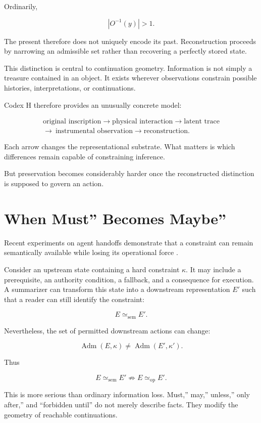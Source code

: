 \documentclass[11pt]{article}
\newcommand{\Adm}{\operatorname{Adm}}
\newcommand{\semEq}{\simeq_{\mathrm{sem}}}
\newcommand{\opEq}{\simeq_{\mathrm{op}}}
\begin{document}
Ordinarily,

\[ |O^{-1}(y)|>1.\]

The present therefore does not uniquely encode its past. Reconstruction proceeds by narrowing an admissible set rather than recovering a perfectly stored state.

This distinction is central to continuation geometry. Information is not simply a treasure contained in an object. It exists wherever observations constrain possible histories, interpretations, or continuations.

Codex H therefore provides an unusually concrete model:

\[ \begin{gathered} \text{original inscription} \rightarrow \text{physical interaction} \rightarrow \text{latent trace} \\ \rightarrow\ \text{instrumental observation} \rightarrow \text{reconstruction}. \end{gathered} \]

Each arrow changes the representational substrate. What matters is which differences remain capable of constraining inference.

But preservation becomes considerably harder once the reconstructed distinction is supposed to govern an action.

\section{When Must'' Becomes Maybe''}

Recent experiments on agent handoffs demonstrate that a constraint can remain semantically available while losing its operational force \cite{sun2026must}.

Consider an upstream state containing a hard constraint $\kappa$. It may include a prerequisite, an authority condition, a fallback, and a consequence for execution. A summarizer can transform this state into a downstream representation $E'$ such that a reader can still identify the constraint:

\[ E \semEq E'.\]

Nevertheless, the set of permitted downstream actions can change:

\[ \Adm(E,\kappa) \neq \Adm(E',\kappa').\]

Thus

\[ \boxed{ E\semEq E' \not\Rightarrow E\opEq E'. }\]

This is more serious than ordinary information loss. Must,'' may,'' unless,'' only after,'' and ``forbidden until'' do not merely describe facts. They modify the geometry of reachable continuations.
\end{document}
